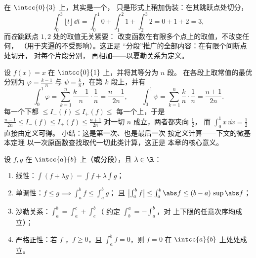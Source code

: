 \begin{example}\label{ex:b1:integration:piecewise}
在 $\intcc{0}{3}$ 上，其实是一个，
只是形式上稍加伪装：在其跳跃点处切分，
\[
\int_0^3 \lfloor t \rfloor\,\dd t
= \int_0^1 0 + \int_1^2 1 + \int_2^3 2 = 0 + 1 + 2 = 3 ,
\]
而\emph{在}跳跃点 $1, 2$ 处的取值无关紧要：
改变函数在有限多个点上的取值，不改变任何，
（用于夹逼的不受影响）。这正是
“分段”推广的全部内容：在有限个间断点处切开，
对每个片段分别，
再相加——以夏勒关系为定义。
\end{example}

\begin{example}[定义只需计算一次]\label{ex:b1:integration:defcompute}
设 $f(x) = x$ 在 $\intcc{0}{1}$ 上，并将其等分为 $n$ 段。
在各段上取常值的最优分别为 $\varphi =
\frac{k-1}{n}$ 与 $\psi = \frac kn$，在第 $k$ 段上，并有
\[
\int_0^1 \varphi = \sum_{k=1}^{n} \frac{k-1}{n}\cdot\frac1n
= \frac{n-1}{2n},
\qquad
\int_0^1 \psi = \sum_{k=1}^{n} \frac{k}{n}\cdot\frac1n
= \frac{n+1}{2n} .
\]
每一个下都 $\leq I_-(f) \leq I_+(f) \leq$
每一个上，于是 $\frac{n-1}{2n} \leq I_-(f) \leq I_+(f) \leq
\frac{n+1}{2n}$ 对一切 $n$ 成立，两者都夹向 $\frac12$，
而 $\int_0^1 x\,\dd x = \frac12$ 直接由定义可得。
小结：这是第一次、也是最后一次
按定义计算——下文的微基本定理
以一次原函数查找取代一切此类计算，这正是
本章的核心意义。
\end{example}

\begin{theorem}[性质]\label{thm:b1:integration:props}
设 $f, g$ 在 $\intcc{a}{b}$ 上（或分段），且
$\lambda \in \R$：
\begin{enumerate}
  \item 线性：$\int (f + \lambda g) = \int f + \lambda \int g$；
  \item 单调性：$f \leq g \implies \int_a^b f \leq \int_a^b g$；
        且 $\bigl|\int_a^b f\bigr| \leq \int_a^b \abs f \leq (b -
        a)\, \sup\abs f$；
  \item 沙勒关系：$\int_a^b = \int_a^c + \int_c^b$（
        约定 $\int_b^a = -\int_a^b$，对
        上下限的任意次序均成立）；
  \item 严格正性：若 $f$ ，$f \geq 0$，且
        $\int_a^b f = 0$，则 $f = 0$ 在
        $\intcc{a}{b}$ 上处处成立。
\end{enumerate}
\end{theorem}

